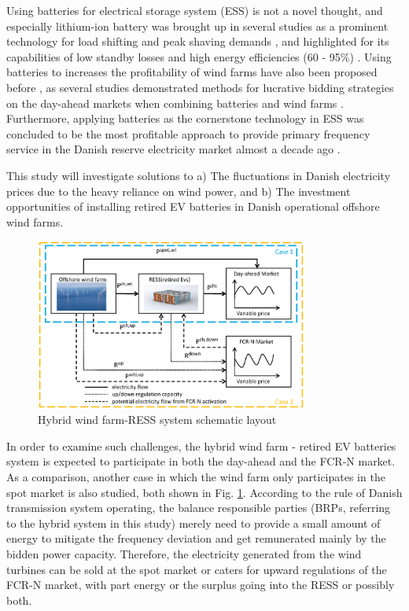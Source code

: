 Using batteries for electrical storage system (ESS) is not a novel thought, and especially lithium-ion battery was brought up in several studies as a prominent technology for load shifting and peak shaving demands \cite{Luo2015OverviewOperation, Zakeri2015Corrigendum569596,Wen2018Multi-time-scaleStorage, Fang2018DynamicSystems}, and highlighted for its capabilities of low standby losses and high energy efficiencies (60 - 95\%) \cite{Chen2009ProgressReview}. Using batteries to increases the profitability of wind farms have also been proposed before \cite{Hou2018CooperationMarkets}, as several studies demonstrated methods for lucrative bidding strategies on the day-ahead markets when combining batteries and wind farms \cite{Baringo2016OfferingApproach, Dai2015OptimalMarket}. Furthermore, applying batteries as the cornerstone technology in ESS was concluded to be the most profitable approach to provide primary frequency service in the Danish reserve electricity market almost a decade ago \cite{Jozef2011AalborgA}.

This study will investigate solutions to a) The fluctuations in Danish electricity prices due to the heavy reliance on wind power, and b) The investment opportunities of installing retired EV batteries in Danish operational offshore wind farms. 

\begin{figure}
\centering
\includegraphics[width = 0.8\textwidth]{figures/model.eps}
\caption{Hybrid wind farm-RESS system schematic layout}
\label{fig:model}
\end{figure}

In order to examine such challenges, the hybrid wind farm - retired EV batteries system is expected to participate in both the day-ahead and the FCR-N market. As a comparison, another case in which the wind farm only participates in the spot market is also studied, both shown in Fig. \ref{fig:model}. According to the rule of Danish transmission system operating, the balance responsible parties (BRPs, referring to the hybrid system in this study) merely need to provide a small amount of energy to mitigate the frequency deviation and get remunerated mainly by the bidden power capacity. Therefore, the electricity generated from the wind turbines can be sold at the spot market or caters for upward regulations of the FCR-N market, with part energy or the surplus going into the RESS or possibly both.

